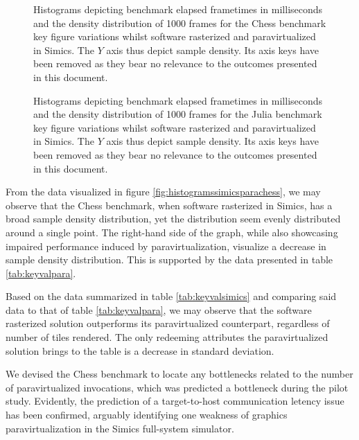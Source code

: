\begin{figure}
  \centering
  
  \caption[Benchmark results -- paravirtualized in Simics, Chess]{Histograms depicting benchmark elapsed frametimes in milliseconds and the density distribution of 1000 frames for the Chess benchmark key figure variations whilst software rasterized and paravirtualized in Simics. The $Y$ axis thus depict sample density. Its axis keys have been removed as they bear no relevance to the outcomes presented in this document.}
  \label{fig:histogramssimicsparachess}

  
  \caption[Benchmark results -- paravirtualized in Simics, Julia]{Histograms depicting benchmark elapsed frametimes in milliseconds and the density distribution of 1000 frames for the Julia benchmark key figure variations whilst software rasterized and paravirtualized in Simics. The $Y$ axis thus depict sample density. Its axis keys have been removed as they bear no relevance to the outcomes presented in this document.}
  \label{fig:histogramssimicsparajulia}
\end{figure}

From the data visualized in figure \ref{fig:histogramssimicsparachess}, we may observe that the Chess benchmark, when software rasterized in Simics, has a broad sample density distribution, yet the distribution seem evenly distributed around a single point.
The right-hand side of the graph, while also showcasing impaired performance induced by paravirtualization, visualize a decrease in sample density distribution.
This is supported by the data presented in table \ref{tab:keyvalpara}.

Based on the data summarized in table \ref{tab:keyvalsimics} and comparing said data to that of table \ref{tab:keyvalpara}, we may observe that the software rasterized solution outperforms its paravirtualized counterpart, regardless of number of tiles rendered.
The only redeeming attributes the paravirtualized solution brings to the table is a decrease in standard deviation.

We devised the Chess benchmark to locate any bottlenecks related to the number of paravirtualized invocations, which was predicted a bottleneck during the pilot study.
Evidently, the prediction of a target-to-host communication letency issue has been confirmed, arguably identifying one weakness of graphics paravirtualization in the Simics full-system simulator.

